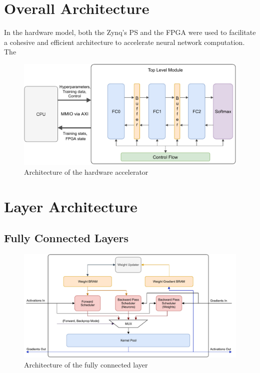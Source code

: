 \section{Overall Architecture}
In the hardware model, both the Zynq's PS and the FPGA were used to facilitate a cohesive and efficient architecture to accelerate neural network computation. The 

\begin{figure}
	\centering 
	\includegraphics[width=\textwidth]{figures/overall_arch}
	\caption{Architecture of the hardware accelerator}\label{overall-arch}
\end{figure}

\section{Layer Architecture}

\subsection{Fully Connected Layers}

\begin{figure}
	\centering 
	\includegraphics[width=\textwidth]{figures/fully_connected_arch}
	\caption{Architecture of the fully connected layer}\label{fc-arch}
\end{figure}

